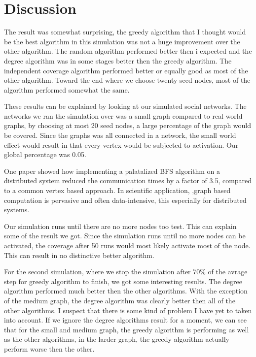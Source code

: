 \chapter{Discussion}
The result was somewhat surprising, the greedy algorithm that I thought would be the best algorithm in this simulation was not a huge improvement over the other algorithm. The random algorithm performed better then i expected and the degree algorithm was in some stages better then the greedy algorithm. The independent coverage algorithm performed better or equally good as most of the other algorithm. Toward the end where we choose twenty seed nodes, most of the algorithm performed somewhat the same.

These results can be explained by looking at our simulated social networks. The networks we ran the simulation over was a small graph compared to real world graphs, by choosing at most 20 seed nodes, a large percentage of the graph would be covered. Since the graphs was all connected in a network, the small world effect would result in that every vertex would be subjected to activation. Our global percentage was 0.05. 

One paper showed how implementing a palatalized BFS algorithm on a distributed system reduced the communication times by a factor of 3.5, compared to a common vertex based approach\cite{ParallelBFS2011}.  In scientific application, ,graph based computation is pervasive and often data-intensive, this especially for distributed systems. 

Our simulation runs until there are no more nodes too test. This can explain some of the result we got. Since the simulation runs until no more nodes can be activated, the coverage after 50 runs would most likely activate most of the node. This can result in no distinctive better algorithm. 

For the second simulation, where we stop the simulation after 70\% of the avrage step for greedy algorithm to finish, we got some interesting results. The degree algorithm performed much better then the other algorithms. With the exception of the medium graph, the degree algorithm was clearly better then all of the other algorithms. I suspect that there is some kind of problem I have yet to taken into account. If we ignore the degree algorithms result for a moment, we can see that for the small and medium graph, the greedy algorithm is performing as well as the other algorithms, in the larder graph, the greedy algorithm actually perform worse then the other.


